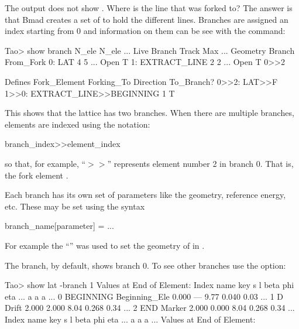\documentclass{hitec}
\begin{document}
The  output does not show . Where is the line that was forked to? The answer is
that Bmad creates a set of  to hold the different lines. Branches are assigned an index
starting from 0 and information on them can be see with the  command:
\begin{code}
Tao> show branch
                    N_ele  N_ele   ...              Live
  Branch            Track    Max   ...    Geometry  Branch  From_Fork
  0: LAT                4      5   ...    Open       T
  1: EXTRACT_LINE       2      2   ...    Open       T      0>>2
 
                                                                    Defines
  Fork_Element      Forking_To                         Direction    To_Branch?
  0>>2: LAT>>F      1>>0: EXTRACT_LINE>>BEGINNING        1             T
\end{code}  
This shows that the lattice has two branches. When there are multiple branches, elements
are indexed using the notation:
\begin{code}
branch_index>>element_index
\end{code}
so that, for example, ``$>>$'' represents element number 2 in branch 0. That is, the
fork element . 

Each branch has its own set of parameters like the geometry, reference energy, etc. These may be set
using the syntax
\begin{code}
  branch_name[parameter] = ...
\end{code}
For example the ``'' was used to set the geometry of  in
.

\newpage

The  branch, by default, shows branch 0. To see other branches use the  option:
\begin{code}
Tao> show lat -branch 1
      Values at End of Element:
 Index  name      key                     s       l    beta     phi    eta ...
                                                          a       a      a ...
     0  BEGINNING Beginning_Ele       0.000     ---    9.77   0.040   0.03 ...
     1  D         Drift               2.000   2.000    8.04   0.268   0.34 ...
     2  END       Marker              2.000   0.000    8.04   0.268   0.34 ...
 Index  name      key                     s       l    beta     phi    eta ...
                                                          a       a      a ...
      Values at End of Element:
\end{code}
\end{document}

